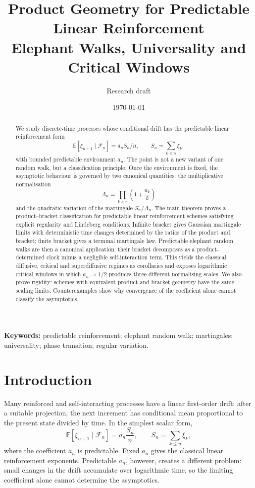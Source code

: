 \documentclass[11pt]{article}
\title{\textbf{Product Geometry for Predictable Linear Reinforcement}\\
Elephant Walks, Universality and Critical Windows}
\author{Research draft}
\date{\today}
\theoremstyle{definition}
\theoremstyle{remark}
\newcommand{\F}{\mathcal{F}}
\newcommand{\E}{\mathbb{E}}
\newcommand{\1}{\mathbf{1}}
\begin{document}
\maketitle

\begin{abstract}
We study discrete-time processes whose conditional drift has the predictable
linear reinforcement form
\[
  \E[\xi_{n+1}\mid\F_n]=a_nS_n/n,\qquad S_n=\sum_{k\le n}\xi_k,
\]
with bounded predictable environment \(a_n\). The point is not a new variant of
one random walk, but a classification principle. Once the environment is fixed,
the asymptotic behaviour is governed by two canonical quantities: the
multiplicative normalisation
\[
  A_n=\prod_{k<n}\left(1+\frac{a_k}{k}\right)
\]
and the quadratic variation of the martingale \(S_n/A_n\). The main theorem
proves a product--bracket classification for predictable linear reinforcement
schemes satisfying explicit regularity and Lindeberg conditions.
Infinite bracket gives Gaussian martingale limits with deterministic time
changes determined by the ratios of the product and bracket; finite bracket
gives a terminal martingale law. Predictable elephant random walks are then a
canonical application: their bracket decomposes as a product-determined clock
minus a negligible self-interaction term. This yields the classical diffusive,
critical and superdiffusive regimes as corollaries and exposes logarithmic
critical windows in which \(a_n\to1/2\) produces three different normalising
scales. We also prove rigidity: schemes with equivalent product and bracket
geometry have the same scaling limits. Counterexamples show why convergence of
the coefficient alone cannot classify the asymptotics.
\end{abstract}

\noindent\textbf{Keywords:} predictable reinforcement; elephant random walk;
martingales; universality; phase transition; regular variation.

\section{Introduction}

Many reinforced and self-interacting processes have a linear first-order drift:
after a suitable projection, the next increment has conditional mean
proportional to the present state divided by time. In the simplest scalar form,
\[
  \E[\xi_{n+1}\mid\F_n]=a_n\frac{S_n}{n},
  \qquad S_n=\sum_{k\le n}\xi_k,
\]
where the coefficient \(a_n\) is predictable. Fixed \(a_n\) gives the classical
linear reinforcement exponents. Predictable \(a_n\), however, creates a
different problem: small changes in the drift accumulate over logarithmic time,
so the limiting coefficient alone cannot determine the asymptotics.
\end{document}
